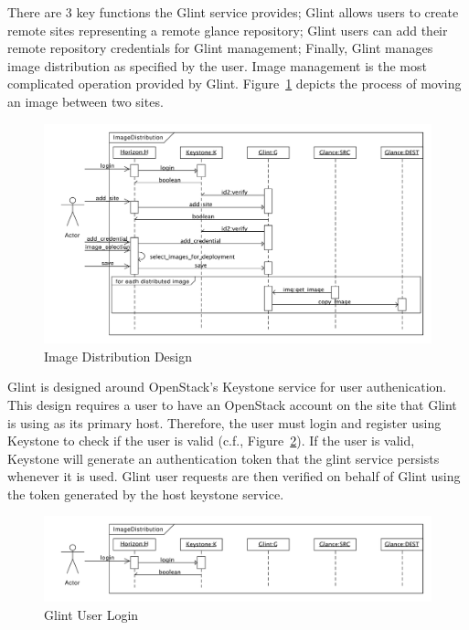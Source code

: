 \documentclass[a4paper]{jpconf}
\begin{document}
There are 3 key functions the Glint service provides; Glint allows users to create remote sites representing a remote glance repository; Glint users can add their remote repository credentials for Glint management; Finally, Glint manages image distribution as specified by the user. Image management is the most complicated operation provided by Glint. Figure~\ref{fig:glintseqdiag} depicts the process of moving an image between two sites. 

\begin{figure}[H]
\begin{center}
\includegraphics[width=36pc]{images/glintseqdiag.pdf}
\caption{\label{fig:glintseqdiag}Image Distribution Design}
\end{center}
\end{figure}

Glint is designed around OpenStack's Keystone service for user authenication. This design requires a user to have an OpenStack account on the site that Glint is using as its primary host. Therefore, the user must login and register using Keystone to check if the user is valid (c.f., Figure~\ref{fig:glintlogin}). If the user is valid, Keystone will generate an authentication token that the glint service persists whenever it is used. Glint user requests are then verified on behalf of Glint using the token generated by the host keystone service.

\begin{figure}[H]
\begin{center}
\includegraphics[width=36pc]{images/glintlogin.pdf}
\caption{\label{fig:glintlogin}Glint User Login}
\end{center}
\end{figure}
\end{document}
